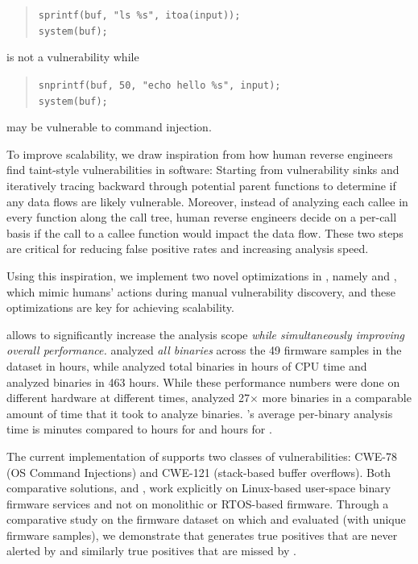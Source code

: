 \begin{quote}
    \small
    \texttt{sprintf(buf, "ls \%s", itoa(input));} \\
    \texttt{system(buf);}
\end{quote}

\noindent
is not a vulnerability while

\begin{quote}
    \small
    \texttt{snprintf(buf, 50, "echo hello \%s", input);} \\
    \texttt{system(buf);}
\end{quote}

\noindent
may be vulnerable to command injection.

To improve scalability, we draw inspiration from how human reverse engineers find taint-style vulnerabilities in software:
Starting from vulnerability sinks and iteratively tracing backward through potential parent functions to determine if any data flows are likely vulnerable.
Moreover, instead of analyzing each callee in every function along the call tree, human reverse engineers decide on a per-call basis if the call to a callee function would impact the data flow.
These two steps are critical for reducing false positive rates and increasing analysis speed.

Using this inspiration, we implement two novel optimizations in \rda, namely \emph{\rev} and \emph{\assumed}, which mimic humans' actions during manual vulnerability discovery, and these optimizations are key for achieving scalability.

\rda allows \mango to significantly increase the analysis scope \emph{while simultaneously improving overall performance.}
\mango analyzed \emph{all \mangoKaronteBinaries binaries} across the 49 firmware samples in the \karonte dataset in \mangoCompTotalTimeHours hours, while \satc analyzed \satcTotalAnalyzedBins total binaries in \satcCompTotalTimeHours hours of CPU time and \karonte analyzed \karonteAnalyzedBinaries binaries in 463 hours.
While these performance numbers were done on different hardware at different times, \mango analyzed 27$\times$ more binaries in a comparable amount of time that it took \satc to analyze \satcTotalAnalyzedBins binaries.
\mango's average per-binary analysis time is \mangoavgtime minutes compared to \SaTCTimePerBin hours for \satc and \karonteTimePerBin hours for \karonte.

The current implementation of \mango supports two classes of vulnerabilities:
CWE-78 (OS Command Injections) and CWE-121 (stack-based buffer overflows).
Both comparative solutions, \karonte and \satc, work explicitly on Linux-based user-space binary firmware services and not on monolithic or RTOS-based firmware.
Through a comparative study on the firmware dataset on which \satc and \karonte evaluated (with \karontesize unique firmware samples), we demonstrate that \mango generates \satcFalseNegatives true positives that are never alerted by \satc and similarly \karonteFalseNegatives true positives that are missed by \karonte.

